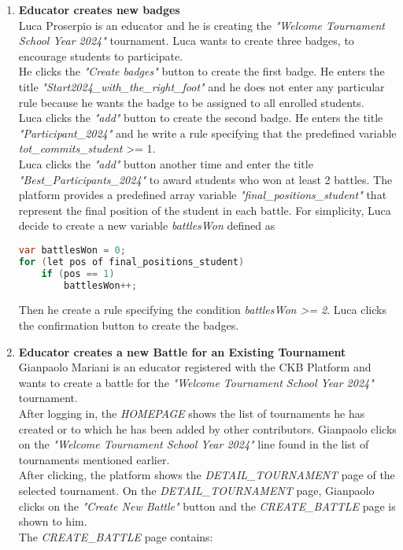 \begin{enumerate}
	\item \textbf{Educator creates new badges}\\
	      Luca Proserpio is an educator and he is creating the \emph{"Welcome Tournament School Year 2024"} tournament.
	      Luca wants to create three badges, to encourage students to participate.\\
	      He clicks the \emph{"Create badges"} button to create the first badge.
	      He enters the title \emph{"Start2024_with_the_right_foot"} and he does not enter any particular rule because he wants the badge to be assigned to all enrolled students.\\
	      Luca clicks the \emph{"add"} button to create the second badge.
	      He enters the title \emph{"Participant_2024"} and he write a rule specifying that the predefined variable \emph{tot_commits_student} >= 1.\\
	      Luca clicks the \emph{"add"} button another time and enter the title \emph{"Best_Participants_2024"} to award students who won at least 2 battles.
	      The platform provides a predefined array variable \emph{"final_positions_student"} that represent the final position of the student in each battle.
	      For simplicity, Luca decide to create a new variable \emph{battlesWon} defined as
	      \begin{lstlisting}[language=java, morekeywords={var, let, of}, keywordstyle=\color{blue}]
var battlesWon = 0;
for (let pos of final_positions_student)
	if (pos == 1)
		battlesWon++;
		  \end{lstlisting}
	      Then he create a rule specifying the condition \emph{battlesWon >= 2}.
	      Luca clicks the confirmation button to create the badges.


	\item \textbf{Educator creates a new Battle for an Existing Tournament}\\
	      Gianpaolo Mariani is an educator registered with the CKB Platform and wants to create a battle for the \emph{"Welcome Tournament School Year 2024"} tournament.\\
	      After logging in, the \emph{HOMEPAGE} shows the list of tournaments he has created or to which he has been added by other contributors. Gianpaolo clicks on the \emph{"Welcome
		      Tournament School Year 2024"} line found in the list of tournaments mentioned earlier.\\
	      After clicking, the platform shows the \emph{DETAIL\_TOURNAMENT} page of the selected tournament.
	      On the \emph{DETAIL\_TOURNAMENT} page, Gianpaolo clicks on the \emph{"Create New Battle"} button and the \emph{CREATE\_BATTLE} page is shown to him.\\
	      The \emph{CREATE\_BATTLE} page contains:


\end{enumerate}

